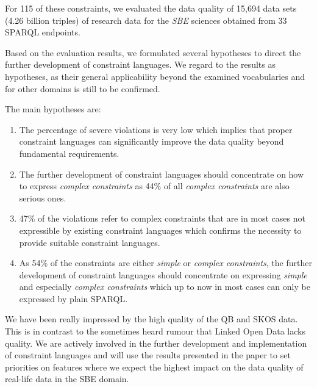 \documentclass[conference]{IEEEtran}
\begin{document}
For 115 of these constraints, we evaluated  the data quality of 15,694 data sets (4.26 billion triples) of research data for the \emph{SBE} sciences obtained from 33 SPARQL endpoints.

Based on the evaluation results,
we formulated several hypotheses to direct the further development of constraint languages. We regard to the results as hypotheses, as their general applicability beyond the examined vocabularies and for other domains is still to be confirmed.

The main hypotheses are: 
\begin{enumerate}
	\item The percentage of severe violations is very low which implies that proper constraint languages can significantly improve the data quality beyond fundamental requirements.
  \item The further development of constraint languages should concentrate on how to express \emph{complex constraints} as 44\% of all \emph{complex constraints} are also serious ones.
  \item 47\% of the violations refer to complex constraints that are in most cases not expressible by existing constraint languages which confirms the necessity to provide suitable constraint languages.
  \item As 54\% of the constraints are either \emph{simple} or \emph{complex constraints},
the further development of constraint languages should concentrate on expressing \emph{simple} and especially \emph{complex constraints} which up to now in most cases can only be expressed by plain SPARQL. 
\end{enumerate}

We have been really impressed by the high quality of the QB and SKOS data. This is in contrast to the sometimes heard rumour that Linked Open Data lacks quality. We are actively involved in the further development and implementation of constraint languages and will use the results presented in the paper to set priorities on features where we expect the highest impact on the data quality of real-life data in the SBE domain.

%
%
\end{document}

